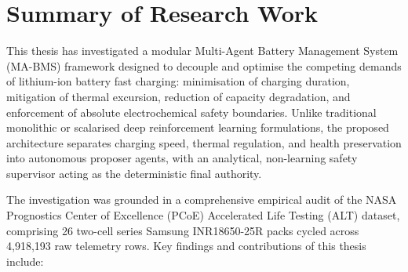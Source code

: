 \label{chap.8}

\section{Summary of Research Work}

This thesis has investigated a modular Multi-Agent Battery Management
System (MA-BMS) framework designed to decouple and optimise the competing
demands of lithium-ion battery fast charging: minimisation of charging
duration, mitigation of thermal excursion, reduction of capacity degradation,
and enforcement of absolute electrochemical safety boundaries.
Unlike traditional monolithic or scalarised deep reinforcement learning
formulations, the proposed architecture separates charging speed, thermal
regulation, and health preservation into autonomous proposer agents, with
an analytical, non-learning safety supervisor acting as the deterministic
final authority.

The investigation was grounded in a comprehensive empirical audit of the
NASA Prognostics Center of Excellence (PCoE) Accelerated Life Testing (ALT)
dataset, comprising 26 two-cell series Samsung INR18650-25R packs cycled
across 4{,}918{,}193 raw telemetry rows. Key findings and contributions
of this thesis include:

